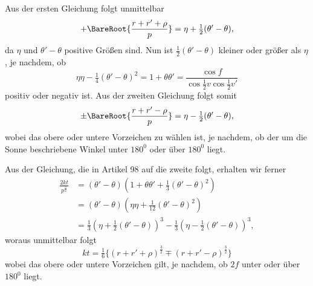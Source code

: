 \par
Aus der ersten Gleichung folgt unmittelbar
\[
+\BareRoot{\frac{r+r'+\rho}{p}}=\eta+\tfrac12(\theta'-\theta),
\]
\noindent da $\eta$ und $\theta'-\theta$ positive Größen sind. Nun ist $\tfrac12(\theta'-\theta)$ kleiner oder größer als $\eta$, je nachdem, ob
\[
\eta\eta-\tfrac14(\theta'-\theta)^2=1+\theta\theta'=\frac{\cos f}{\cos\tfrac12v\cos\tfrac12v'}
\]
\noindent positiv oder negativ ist. \begingroup{} Aus der zweiten Gleichung folgt somit
\[
\pm\BareRoot{\frac{r+r'-\rho}{p}}=\eta-\tfrac12(\theta'-\theta),
\]
\noindent wobei das obere oder untere Vorzeichen zu wählen ist, je nachdem, ob der um die Sonne beschriebene Winkel unter $180^0$ oder über $180^0$ liegt.\endgroup
\par
Aus der Gleichung, die in Artikel 98 auf die zweite folgt, erhalten wir ferner
\[
\begin{aligned}
\frac{2kt}{p^{\frac32}}&=(\theta'-\theta)(1+\theta\theta'+\tfrac13(\theta'-\theta)^2)\\[.6em]
&=(\theta'-\theta)(\eta\eta+\tfrac1{12}(\theta'-\theta)^2)\\[.6em]
&=\tfrac13(\eta+\tfrac12(\theta'-\theta))^3-\tfrac13(\eta-\tfrac12(\theta'-\theta))^3,
\end{aligned}
\]
\begingroup{}
\noindent woraus unmittelbar folgt
\[
kt=\tfrac16\{(r+r'+\rho)^{\frac32}\mp(r+r'-\rho)^{\frac32}\}
\]
\noindent wobei das obere oder untere Vorzeichen gilt, je nachdem, ob $2f$ unter oder über $180^0$ liegt.\endgroup
{}
